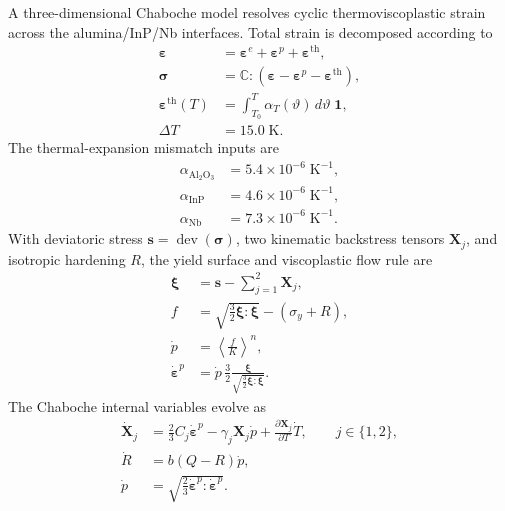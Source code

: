 \documentclass[10pt,twocolumn]{IEEEtran}
\begin{document}
A three-dimensional Chaboche model resolves cyclic thermoviscoplastic strain across the alumina/InP/Nb interfaces. Total strain is decomposed according to
\begin{equation}
\begin{aligned}
\bm\varepsilon&=\bm\varepsilon^e
+\bm\varepsilon^{p}+\bm\varepsilon^{\mathrm{th}}, \\
\bm\sigma&=\mathbb C:
\left(\bm\varepsilon-\bm\varepsilon^{p}
-\bm\varepsilon^{\mathrm{th}}\right), \\
\bm\varepsilon^{\mathrm{th}}(T)
&=\int_{T_0}^{T}\alpha_T(\vartheta)\,d\vartheta\;\bm 1, \\
\Delta T&=15.0\;\mathrm{K}.
\end{aligned}
\label{eq:strain_decomposition}
\end{equation}
The thermal-expansion mismatch inputs are
\begin{equation}
\begin{aligned}
\alpha_{\mathrm{Al_2O_3}}&=5.4\times10^{-6}\;\mathrm{K^{-1}}, \\
\alpha_{\mathrm{InP}}&=4.6\times10^{-6}\;\mathrm{K^{-1}}, \\
\alpha_{\mathrm{Nb}}&=7.3\times10^{-6}\;\mathrm{K^{-1}}.
\end{aligned}
\label{eq:cte_inputs}
\end{equation}
With deviatoric stress $\bm s=\operatorname{dev}(\bm\sigma)$, two kinematic backstress tensors $\bm X_j$, and isotropic hardening $R$, the yield surface and viscoplastic flow rule are
\begin{equation}
\begin{aligned}
\bm\xi&=\bm s-\sum_{j=1}^{2}\bm X_j, \\
f&=\sqrt{\frac{3}{2}\bm\xi:\bm\xi}
-\left(\sigma_y+R\right), \\
\dot p&=\left\langle\frac{f}{K}\right\rangle^{n}, \\
\dot{\bm\varepsilon}^{p}
&=\dot p\,\frac{3}{2}
\frac{\bm\xi}{\sqrt{\frac{3}{2}\bm\xi:\bm\xi}}.
\end{aligned}
\label{eq:chaboche_flow}
\end{equation}
The Chaboche internal variables evolve as
\begin{equation}
\begin{aligned}
\dot{\bm X}_j
&=\frac{2}{3}C_j\dot{\bm\varepsilon}^{p}
-\gamma_j\bm X_j\dot p
+\frac{\partial\bm X_j}{\partial T}\dot T,
\qquad j\in\{1,2\}, \\
\dot R&=b(Q-R)\dot p, \\
\dot p&=\sqrt{\frac{2}{3}
\dot{\bm\varepsilon}^{p}:\dot{\bm\varepsilon}^{p}}.
\end{aligned}
\label{eq:chaboche_hardening}
\end{equation}
\end{document}
